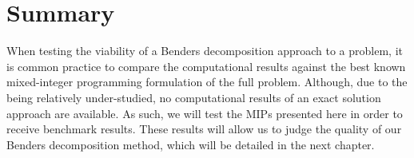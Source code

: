 \section{Summary}
\label{sec:mip:summary}
When testing the viability of a Benders decomposition
approach to a problem,
it is common practice to compare the computational results against
the best known mixed-integer programming formulation of the full problem.
Although, due to the  being relatively under-studied,
no computational results of an exact solution
approach are available.
As such, we will test the MIPs presented here in order to receive benchmark results.
These results will allow us to judge the quality of our Benders decomposition method,
which will be detailed in the next chapter.

